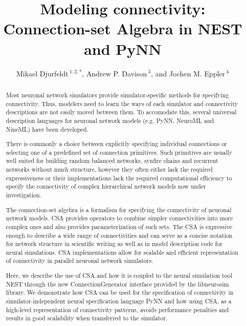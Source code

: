 \documentclass{frontiersSCNS} %
\def\firstAuthorLast{Djurfeldt {et~al.}}
\def\Authors{Mikael Djurfeldt\,$^{1,2,*}$, Andrew P. Davison\,$^{3}$,
 and Jochen M. Eppler\,$^4$}
\begin{document}
\onecolumn
{}

\title[CSA in NEST and PyNN]{Modeling connectivity: Connection-set
 Algebra in NEST and PyNN}
\author[\firstAuthorLast ]{\Authors}
\address{}
\correspondance{}
\extraAuth{}%

\maketitle
\begin{abstract} %

Most neuronal network simulators provide simulator-specific methods
for specifying connectivity. Thus, modelers need to learn the ways of
each simulator and connectivity descriptions are not easily moved
between them.  To accomodate this, several universal description
languages for neuronal network models (e.g. PyNN, NeuroML and NineML)
have been developed.

There is commonly a choice between explicitly specifying individual
connections or selecting one of a predefined set of connection
primitives. Such primitives are usually well suited for building
random balanced networks, synfire chains and recurrent networks
without much structure, however they often either lack the required
expressiveness or their implementations lack the required
computational efficiency to specify the connectivity of complex
hierarchical network models now under investigation.

The connection-set algebra \citep[CSA;][]{djurfeldt12} is a formalism
for specifying the connectivity of neuronal network models. CSA
provides operators to combine simpler connectivities into more complex
ones and also provides parameterization of such sets. The CSA is
expressive enough to describe a wide range of connectivities and can
serve as a concise notation for network structure in scientific
writing as well as in model description code for neural
simulations. CSA implementations allow for scalable and efficient
representation of connectivity in parallel neuronal network
simulators.

Here, we describe the use of CSA and how it is coupled to the neural
simulation tool NEST \citep{Gewaltig_07_11204} through the new
ConnectionGenerator interface provided by the libneurosim library. We
demonstrate how CSA can be used for the specification of connectivity
in simulator-independent neural specification language PyNN
\citep{Davison09} and how using CSA, as a high-level representation of
connectivity patterns, avoids performance penalties and results in
good scalability when transferred to the simulator.


\end{abstract}
\end{document}
